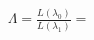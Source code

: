 \documentclass[preview]{standalone}
\begin{document}
\begin{align*}
\Lambda = \frac{L(\lambda_0)}{L(\lambda_1)} =
\end{align*}
\end{document}
